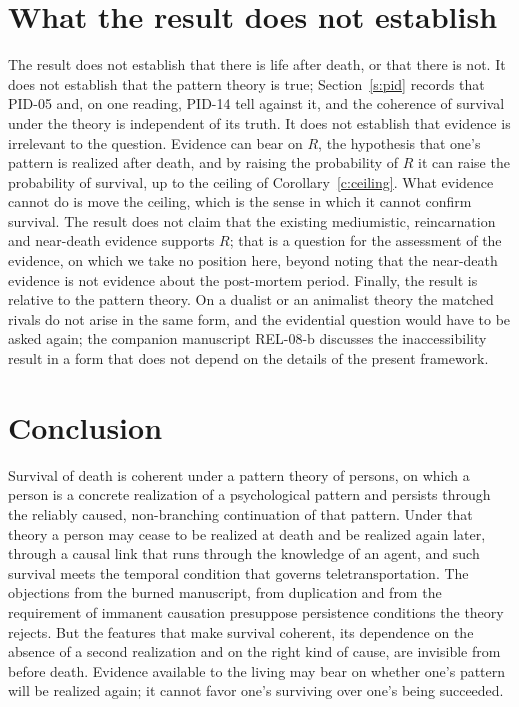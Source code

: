 \documentclass{situationist-preprint}
\begin{document}
\section{What the result does not establish}\label{s:not}

The result does not establish that there is life after death, or that there is not. It does not establish that the pattern theory is true; Section~\ref{s:pid} records that PID-05 and, on one reading, PID-14 tell against it, and the coherence of survival under the theory is independent of its truth. It does not establish that evidence is irrelevant to the question. Evidence can bear on $R$, the hypothesis that one's pattern is realized after death, and by raising the probability of $R$ it can raise the probability of survival, up to the ceiling of Corollary~\ref{c:ceiling}. What evidence cannot do is move the ceiling, which is the sense in which it cannot confirm survival. The result does not claim that the existing mediumistic, reincarnation and near-death evidence supports $R$; that is a question for the assessment of the evidence, on which we take no position here, beyond noting that the near-death evidence is not evidence about the post-mortem period. Finally, the result is relative to the pattern theory. On a dualist or an animalist theory the matched rivals do not arise in the same form, and the evidential question would have to be asked again; the companion manuscript REL-08-b discusses the inaccessibility result in a form that does not depend on the details of the present framework.

\section{Conclusion}

Survival of death is coherent under a pattern theory of persons, on which a person is a concrete realization of a psychological pattern and persists through the reliably caused, non-branching continuation of that pattern. Under that theory a person may cease to be realized at death and be realized again later, through a causal link that runs through the knowledge of an agent, and such survival meets the temporal condition that governs teletransportation. The objections from the burned manuscript, from duplication and from the requirement of immanent causation presuppose persistence conditions the theory rejects. But the features that make survival coherent, its dependence on the absence of a second realization and on the right kind of cause, are invisible from before death. Evidence available to the living may bear on whether one's pattern will be realized again; it cannot favor one's surviving over one's being succeeded.
\end{document}
